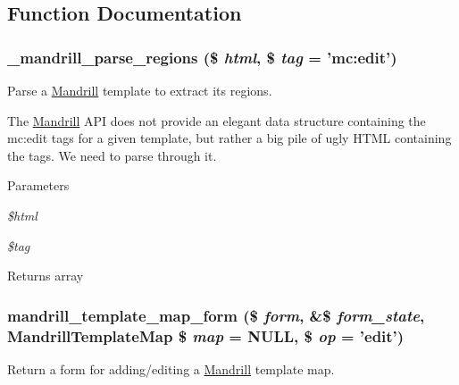 \subsection{Function Documentation}
\hypertarget{mandrill__template_8admin_8inc_a81a803bf15fe218cc61b3706a9334848}{
\subsubsection[{\_\-mandrill\_\-parse\_\-regions}]{\setlength{\rightskip}{0pt plus 5cm}\_\-mandrill\_\-parse\_\-regions (\$ {\em html}, \/  \$ {\em tag} = {\ttfamily 'mc:edit'})}}
\label{mandrill__template_8admin_8inc_a81a803bf15fe218cc61b3706a9334848}
Parse a \hyperlink{classMandrill}{Mandrill} template to extract its regions.

The \hyperlink{classMandrill}{Mandrill} API does not provide an elegant data structure containing the mc:edit tags for a given template, but rather a big pile of ugly HTML containing the tags. We need to parse through it.


\begin{DoxyParams}{Parameters}
\item[{\em \$html}]\item[{\em \$tag}]\end{DoxyParams}
\begin{DoxyReturn}{Returns}
array 
\end{DoxyReturn}
\hypertarget{mandrill__template_8admin_8inc_ac57659a507efa477f482968d94e19cef}{
\subsubsection[{mandrill\_\-template\_\-map\_\-form}]{\setlength{\rightskip}{0pt plus 5cm}mandrill\_\-template\_\-map\_\-form (\$ {\em form}, \/  \&\$ {\em form\_\-state}, \/  {\bf MandrillTemplateMap} \$ {\em map} = {\ttfamily NULL}, \/  \$ {\em op} = {\ttfamily 'edit'})}}
\label{mandrill__template_8admin_8inc_ac57659a507efa477f482968d94e19cef}
Return a form for adding/editing a \hyperlink{classMandrill}{Mandrill} template map.


